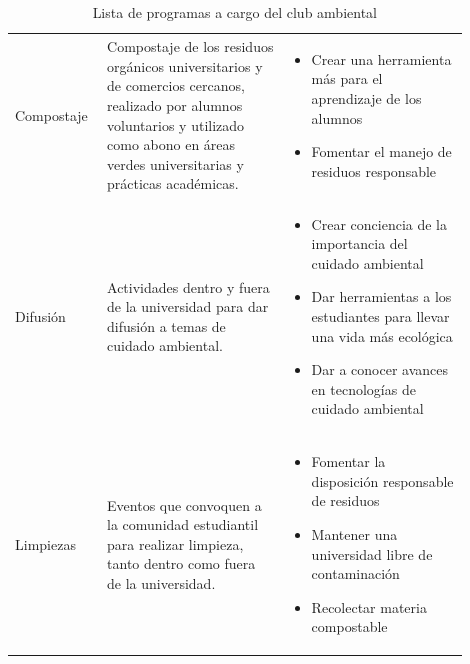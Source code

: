 \begin{table}[H]
\centering
\caption{Lista de programas a cargo del club ambiental}
\label{tab:porgramas_del_club_ambiental}
{\small{} %

\begin{tabular}{M{0.15\linewidth}M{0.375\linewidth}M{0.375\linewidth}}\hline
    
     &  &  \\ \hline

    Compostaje & Compostaje de los residuos orgánicos universitarios y de comercios cercanos, realizado por alumnos voluntarios y utilizado como abono en áreas verdes universitarias y prácticas académicas.
    &
    \begin{itemize}
        \item Crear una herramienta más para el aprendizaje de los alumnos
        \item Fomentar el manejo de residuos responsable
    \end{itemize} \\

    Difusión & Actividades dentro y fuera de la universidad para dar difusión a temas de cuidado ambiental.
    &
    \begin{itemize}
        \item Crear conciencia de la importancia del cuidado ambiental
        \item Dar herramientas a los estudiantes para llevar una vida más ecológica
        \item Dar a conocer avances en tecnologías de cuidado ambiental
    \end{itemize} \\

    Limpiezas & Eventos que convoquen a la comunidad estudiantil para realizar limpieza, tanto dentro como fuera de la universidad.
    &
    \begin{itemize}
        \item Fomentar la disposición responsable de residuos
        \item Mantener una universidad libre de contaminación
        \item Recolectar materia compostable
    \end{itemize} \\


\end{tabular}}
\end{table}
